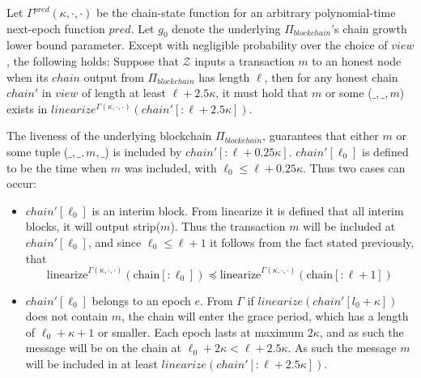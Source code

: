 \begin{lemma}
Let $\Gamma^{pred}(\kappa, \cdot, \cdot)$ be the chain-state function for an arbitrary polynomial-time next-epoch function $pred$. Let $g_0$ denote the underlying $\Pi_{blockchain}$'s chain growth lower bound parameter. Except with negligible probability over the choice of $view$, the following holds: Suppose that $\mathcal{Z}$ inputs a transaction $m$ to an honest node when its $chain$ output from $\Pi_{blockchain}$ has length $\ell$, then for any honest chain $chain'$ in $view$ of length at least $\ell + 2.5\kappa$, it must hold that $m$ or some ($\_,\_,m$) exists in $linearize^{\Gamma(\kappa,\cdot,\cdot)}(chain'[:\ell+2.5\kappa])$.
\end{lemma}

The liveness of the underlying blockchain $\Pi_{blockchain}$, guarantees that either $m$ or some tuple ($\_,\_,m,\_$) is included by $chain'[:\ell+0.25\kappa]$. $chain'[\ell_0]$ is defined to be the time when $m$ was included, with $\ell_0 \leq \ell+0.25\kappa$. Thus two cases can occur: 
\begin{itemize}
    \item $chain'[\ell_0]$ is an interim block. From linearize it is defined that all interim blocks, it will output strip($m$). Thus the transaction $m$ will be included at $chain'[\ell_0]$, and since $\ell_0 \leq \ell+1$ it follows from the fact stated previously, that
    \begin{equation*}
        \text{linearize}^{\Gamma(\kappa,\cdot,\cdot)}(\text{chain}[:\ell_0]) \preceq \text{linearize}^{\Gamma(\kappa,\cdot,\cdot)}(\text{chain}[:\ell+1])
    \end{equation*}
    
    \item $chain'[\ell_0]$ belongs to an epoch $e$. From $\Gamma$ if $linearize(chain'[l_0+\kappa])$ does not contain $m$, the chain will enter the grace period, which has a length of $\ell_0 + \kappa + 1$ or smaller. Each epoch lasts at maximum $2\kappa$, and as such the message will be on the chain at $\ell_0 + 2\kappa < \ell + 2.5\kappa$. As such the message $m$ will be included in at least $linearize(chain'[:\ell + 2.5\kappa])$.
\end{itemize}



